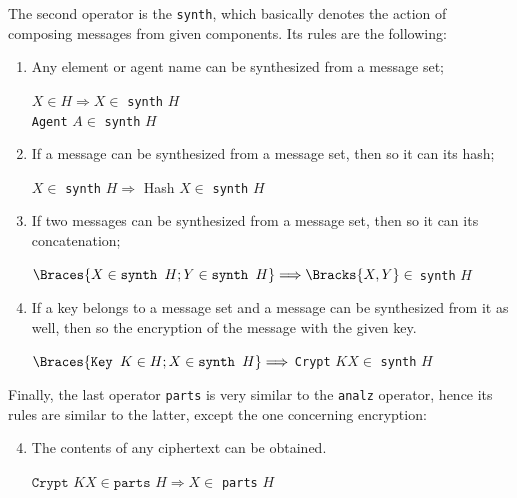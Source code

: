 The second operator is the \texttt{synth}, which basically denotes the action of composing messages from given components. Its rules are the following:

\begin{enumerate}
  \item Any element or agent name can be synthesized from a message set;
  \begin{center}
    $X \in H \Longrightarrow X \in$ \texttt{synth} $H$ \\
    \texttt{Agent} $A \in$ \texttt{synth} $H$
  \end{center}

  \item If a message can be synthesized from a message set, then so it can its hash;
  \begin{center}
    $X \in$ \texttt{synth} $H \Longrightarrow$ Hash $X \in$ \texttt{synth} $H$
  \end{center}

  \item If two messages can be synthesized from a message set, then so it can its concatenation;
  \begin{center}
    $\Braces{X \in \texttt{synth } H; Y \in \texttt{synth } H} \Longrightarrow \Bracks{X,Y} \in$ \texttt{synth} $H$
  \end{center}

  \item If a key belongs to a message set and a message can be synthesized from it as well, then so the encryption of the message with the given key.
  \begin{center}
    $\Braces{\texttt{Key } K \in H; X \in \texttt{synth } H} \Longrightarrow$ \texttt{Crypt} $K X \in$ \texttt{synth} $H$
  \end{center}
\end{enumerate}

Finally, the last operator \texttt{parts} is very similar to the \texttt{analz} operator, hence its rules are similar to the latter, except the one concerning encryption:

\begin{enumerate} \setcounter{enumi}{3}
  \item The contents of any ciphertext can be obtained.
  \begin{center}
    $\texttt{Crypt } K X \in \texttt{parts } H \Longrightarrow X \in$ \texttt{parts} $H$
  \end{center}
\end{enumerate}

